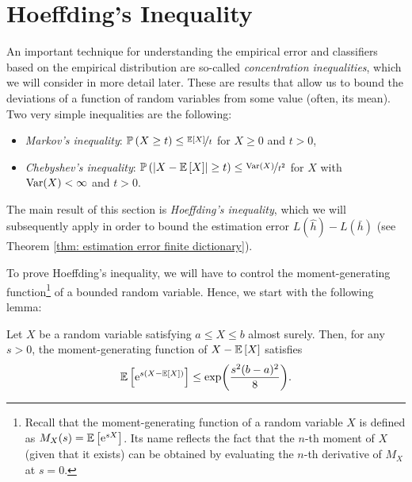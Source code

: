 \section{Hoeffding's Inequality}

An important technique for understanding the empirical error and classifiers based on the empirical distribution are so-called \emph{concentration inequalities}, which we will consider in more detail later. These are results that allow us to bound the deviations of a function of random variables from some value (often, its mean). Two very simple inequalities are the following:

\begin{prop}
\begin{itemize}
    \item \emph{Markov's inequality}: $\mathbb{P}\left(X \geq t\right) \leq \nicefrac{\mathbb{E}\left[X\right]}{t}$ for $X \geq 0$ and $t > 0$,

    \item \emph{Chebyshev’s inequality}: $\mathbb{P}\left(\abs{X - \mathbb{E}\left[X\right]} \geq t\right) \leq \nicefrac{\mathrm{Var}(X)}{t^2}$ for $X$ with $\mathrm{Var}(X) < \infty$ and $t > 0$.
\end{itemize}
\end{prop}

\noindent The main result of this section is \emph{Hoeffding's inequality}, which we will subsequently apply in order to bound the estimation error $L(\hat h) - L(\bar h)$ (see Theorem \ref{thm: estimation error finite dictionary}).

To prove Hoeffding's inequality, we will have to control the moment-generating function\footnote{Recall that the moment-generating function of a random variable $X$ is defined as $M_X(s) = \mathbb{E}\left[\mathrm{e}^{sX}\right]$. Its name reflects the fact that the $n$-th moment of $X$ (given that it exists) can be obtained by evaluating the $n$-th derivative of $M_X$ at $s=0$.} of a bounded random variable. Hence, we start with the following lemma:

\begin{lemma}
\label{lem: hoeffding}
Let $X$ be a random variable satisfying $a \leq X \leq b$ almost surely. Then, for any $s > 0$, the moment-generating function of $X - \mathbb{E}\left[X\right]$ satisfies
\[
    \mathbb{E}\left[\mathrm{e}^{s(X - \mathbb{E}\left[X\right])}\right] \leq \exp(\frac{s^2(b-a)^2}{8}).
\]
\end{lemma}

